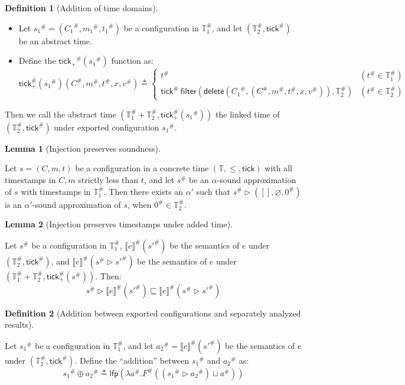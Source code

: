 \documentclass{article}
\theoremstyle{definition}
\newtheorem{definition}{Definition}[section]
\newtheorem{lem}{Lemma}[section]
\newcommand*{\A}[1]{{#1}^{\#}}
\newcommand*{\Time}{\mathbb{T}}
\newcommand*{\ATime}{\A{\Time}}
\newcommand*{\mem}{m}
\newcommand*{\sembracket}[1]{\lBrack{#1}\rBrack}
\newcommand*{\tick}{\mathsf{tick}}
\newcommand*{\delete}{\mathsf{delete}}
\newcommand*{\filter}{\mathsf{filter}}
\begin{document}
\begin{definition}[Addition of time domains]
  $\:$

  \begin{itemize}
    \item Let $\A{s_1}=(\A{C_1},\A{\mem_1},\A{t_1})$ be a configuration in $\ATime_1$, and let $(\ATime_2,\A{\tick})$ be an abstract time.
    \item Define the $\A{\tick_{+}}(\A{s_1})$ function as:
          \[
            \A\tick_{+}(\A{s_1})(\A{C},\A\mem,\A{t},x,\A{v})\triangleq
            \begin{cases}
              \A{t}                                                                      & (\A{t}\in\ATime_1) \\
              \A{\tick}\:\filter(\delete(\A{C_1},(\A{C},\A\mem,\A{t},x,\A{v})),\ATime_2) & (\A{t}\in\ATime_2)
            \end{cases}
          \]
  \end{itemize}

  Then we call the abstract time $(\ATime_1+\ATime_2,\A\tick_{+}(\A{s_1}))$ the linked time of $(\ATime_2,\A{\tick})$ under exported configuration $\A{s_1}$.
\end{definition}

\begin{lem}[Injection preserves soundness]
  $\:$

  Let $s=(C,\mem,t)$ be a configuration in a concrete time $(\Time,\le,\tick)$ with all timestamps in $C,\mem$ strictly less than $t$, and let $\A{s}$ be an $\alpha$-sound approximation of $s$ with timestamps in $\ATime_1$.
  Then there exists an $\alpha'$ such that $\A{s}\rhd([],\varnothing,\A{0})$ is an $\alpha'$-sound approximation of $s$, when $\A{0}\in\ATime_2$.
\end{lem}

\begin{lem}[Injection preserves timestamps under added time]
  $\:$

  Let $\A{s}$ be a configuration in $\ATime_1$, $\A{\sembracket{e}}(\A{s'})$ be the semantics of $e$ under $(\ATime_2,\A\tick)$, and $\A{\sembracket{e}}(\A{s}\rhd\A{s'})$ be the semantics of $e$ under $(\ATime_1+\ATime_2,\A\tick_{+}(\A{s}))$.
  Then:
  \[
    \A{s}\rhd\A{\sembracket{e}}(\A{s'})\sqsubseteq\A{\sembracket{e}}(\A{s}\rhd\A{s'})
  \]
\end{lem}

\begin{definition}[Addition between exported configurations and separately analyzed results]
  $\:$

  Let $\A{s_1}$ be a configuration in $\ATime_1$, and let $\A{a_2}=\A{\sembracket{e}}(\A{s'})$ be the semantics of $e$ under $(\ATime_2,\A\tick)$.
  Define the ``addition'' between $\A{s_1}$ and $\A{a_2}$ as:
  \[
    \A{s_1}\oplus\A{a_2}\triangleq\mathsf{lfp}(\lambda\A{a}.\A{F}((\A{s_1}\rhd\A{a_2})\sqcup\A{a}))
  \]
\end{definition}
\end{document}

